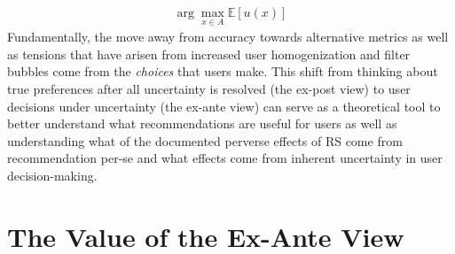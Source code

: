 \documentclass[sigconf]{acmart}
\begin{document}
\begin{align*}
\arg\max\limits_{x \in A} \mathbb{E}[u(x)]
\end{align*}
Fundamentally, the move away from accuracy towards alternative metrics as well as tensions that have arisen from increased user homogenization and filter bubbles come from the \textit{choices} that users make. This shift from thinking about true preferences after all uncertainty is resolved (the ex-post view) to user decisions under uncertainty (the ex-ante view) can serve as a theoretical tool to better understand what recommendations are useful for users as well as understanding what of the documented perverse effects of RS come from recommendation per-se and what effects come from inherent uncertainty in user decision-making.
\section{The Value of the Ex-Ante View}
\end{document}
